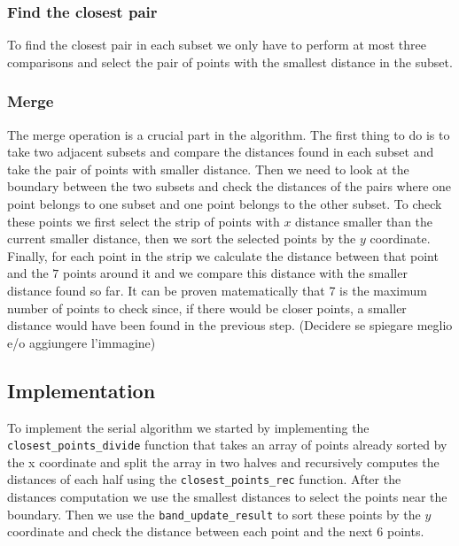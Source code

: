 \subsubsection{Find the closest pair}
To find the closest pair in each subset we only have to perform
at most three comparisons and select the pair of points with the smallest
distance in the subset.

\subsubsection{Merge}
The merge operation is a crucial part in the algorithm.
The first thing to do is to take two adjacent subsets and compare the distances
found in each subset and take the pair of points with smaller distance. Then we
need to look at the boundary between the two subsets and check the distances of
the pairs where one point belongs to one subset and one point belongs to the other
subset. To check these points we first select the strip of points with $x$ distance smaller
than the current smaller distance, then we sort the selected points by the $y$ coordinate.
Finally, for each point in the strip we calculate the distance between that point and
the $7$ points around it and we compare this distance with the smaller distance found so far.
It can be proven matematically that 7 is the maximum number of points to check since, if there
would be closer points, a smaller distance would have been found in the previous step.
(Decidere se spiegare meglio e/o aggiungere l'immagine)

\subsection{Implementation}
To implement the serial algorithm we started by implementing the \verb+closest_points_divide+
function that takes an array of points already sorted by the x coordinate and split the array in two
halves and recursively computes the distances of each half using the \verb+closest_points_rec+
function. After the distances computation we use the smallest distances to select the points
near the boundary. Then we use the \verb+band_update_result+ to sort these points by the $y$ coordinate
and check the distance between each point and the next 6 points.

